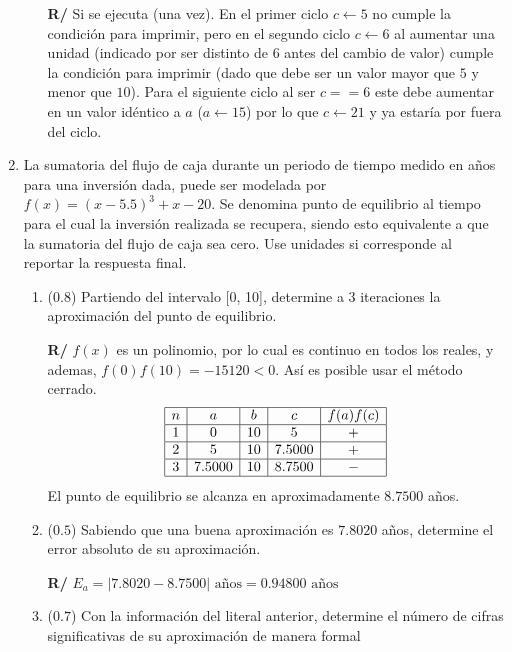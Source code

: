 \documentclass[12pt]{article}
\begin{document}
\begin{enumerate}[leftmargin=*,widest=9]
\begin{enumerate}[label=\alph*]
\textbf{R/} Si se ejecuta (una vez). En el primer ciclo \(c \gets 5\) no cumple la condición para imprimir, pero en el segundo ciclo \(c \gets 6\) al aumentar una unidad (indicado por ser distinto de \(6\) antes del cambio de valor) cumple la condición para imprimir (dado que debe ser un valor mayor que \(5\) y menor que \(10\)). Para el siguiente ciclo al ser \(c== 6\) este debe aumentar en un valor idéntico a \(a\) (\(a \gets 15\)) por lo que \(c \gets 21\) y ya estaría por fuera del ciclo.
    \end{enumerate}
    \item La sumatoria del flujo de caja durante un periodo de tiempo medido en años para una inversión dada, puede ser modelada por \(f(x) = {(x-5.5)}^3 + x - 20\). Se denomina punto de equilibrio al tiempo para el cual la inversión realizada se recupera, siendo esto equivalente a que la sumatoria del flujo de caja sea cero. Use unidades si corresponde al reportar la respuesta final.
    \begin{enumerate}[label=\alph*]
    \item (\(0.8\)) Partiendo del intervalo [0, 10], determine a 3 iteraciones la aproximación del punto de equilibrio.

\textbf{R/} \(f(x)\) es un polinomio, por lo cual es continuo en todos los reales, y ademas, \(f(0)f(10)= -15120 < 0\). Así es posible usar el método cerrado.
\[
\begin{array}{|c|c|c|c|c|}
  \hline
  n & a & b & c & f(a)f(c)\\
  \hline
  1 & 0 & 10 & 5 & + \\
  \hline
  2 & 5 & 10 & 7.5000 & + \\
  \hline
  3 & 7.5000 & 10 & 8.7500 & - \\
  \hline
 \end{array}
\]
El punto de equilibrio se alcanza en aproximadamente \(8.7500\) años.
    \item (\(0.5\)) Sabiendo que una buena aproximación es \(7.8020\) años, determine el error absoluto de su aproximación.

\textbf{R/} \(E_a = |7.8020 - 8.7500| \text{ años} = 0.94800 \text{ años}\)
    \item (\(0.7\)) Con la información del literal anterior, determine el número de cifras significativas de su aproximación de manera formal


\end{enumerate}
\end{enumerate}
\end{document}
